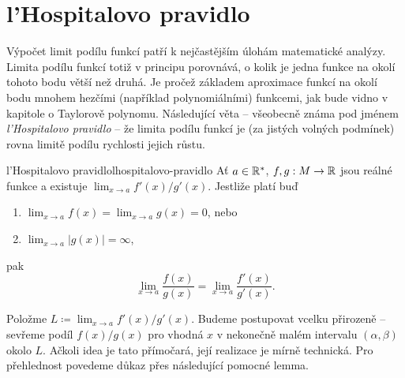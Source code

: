 \section{l'Hospitalovo pravidlo}
\label{sec:l'hospitalovo-pravidlo}

Výpočet limit podílu funkcí patří k nejčastějším úlohám matematické analýzy.
Limita podílu funkcí totiž v principu porovnává, o kolik je jedna funkce na
okolí tohoto bodu větší než druhá. Je pročež základem aproximace funkcí na okolí
bodu mnohem hezčími (například polynomiálními) funkcemi, jak bude vidno v
kapitole o Taylorově polynomu. Následující věta -- všeobecně známa pod jménem
\emph{l'Hospitalovo pravidlo} -- že limita podílu funkcí je (za jistých volných
podmínek) rovna limitě podílu rychlosti jejich růstu.

\begin{theorem}{l'Hospitalovo pravidlo}{lhospitalovo-pravidlo}
 Ať $a \in \mathbb{R}^{*}$, $f,g:M \to \mathbb{R}$ jsou reálné funkce a existuje $\lim_{x \to a}
 f'(x) / g'(x)$. Jestliže platí buď
 \begin{enumerate}[label=(\alph*)]
  \item $\lim_{x \to a} f(x) = \lim_{x \to a} g(x) = 0$, nebo
  \item $\lim_{x \to a} |g(x)| = \infty$,
 \end{enumerate}
 pak
 \[
  \lim_{x \to a} \frac{f(x)}{g(x)} = \lim_{x \to a} \frac{f'(x)}{g'(x)}.
 \]
\end{theorem}


Položme $L \coloneqq \lim_{x \to a} f'(x) / g'(x)$. Budeme postupovat vcelku
přirozeně -- sevřeme podíl $f(x) / g(x)$ pro vhodná $x$ v nekonečně malém
intervalu $(\alpha,\beta)$ okolo $L$. Ačkoli idea je tato přímočará, její
realizace je mírně technická. Pro přehlednost povedeme důkaz přes následující
pomocné lemma.

